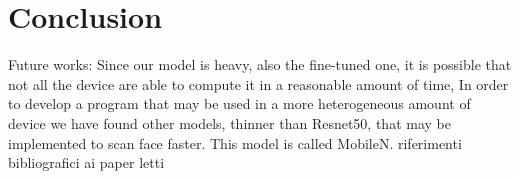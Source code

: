 \section{Conclusion} 

Future works:
Since our model is heavy, also the fine-tuned one, it is possible that not all the device are able to compute it in a reasonable amount of time, In order to develop a program that may be used in a more heterogeneous amount of device we have found other models, thinner than Resnet50, that may be implemented to scan face faster. This model is called MobileN.
riferimenti bibliografici ai paper letti
